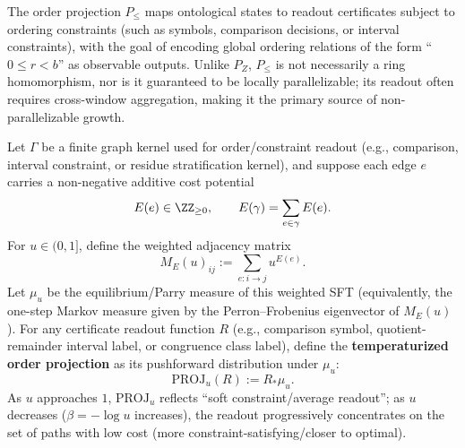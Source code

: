 \begin{definition}\label{def:pom-proj-order}
The order projection $P_{\le}$ maps ontological states to readout certificates subject to ordering constraints (such as symbols, comparison decisions, or interval constraints), with the goal of encoding global ordering relations of the form ``$0\le r<b$'' as observable outputs. Unlike $P_Z$, $P_{\le}$ is not necessarily a ring homomorphism, nor is it guaranteed to be locally parallelizable; its readout often requires cross-window aggregation, making it the primary source of non-parallelizable growth.
\end{definition}

\begin{definition}\label{def:pom-proj-temp}
Let $\Gamma$ be a finite graph kernel used for order/constraint readout (e.g., comparison, interval constraint, or residue stratification kernel), and suppose each edge $e$ carries a non-negative additive cost potential
\[
E(e)\in\ZZ_{\ge 0},
\qquad
E(\gamma)=\sum_{e\in\gamma}E(e).
\]
For $u\in(0,1]$, define the weighted adjacency matrix
\[
M_E(u)_{ij}:=\sum_{e:i\to j}u^{E(e)}.
\]
Let $\mu_u$ be the equilibrium/Parry measure of this weighted SFT (equivalently, the one-step Markov measure given by the Perron--Frobenius eigenvector of $M_E(u)$). For any certificate readout function $R$ (e.g., comparison symbol, quotient-remainder interval label, or congruence class label), define the \textbf{temperaturized order projection} as its pushforward distribution under $\mu_u$:
\[
\mathrm{PROJ}_u(R):=R_\ast\mu_u.
\]
As $u$ approaches $1$, $\mathrm{PROJ}_u$ reflects ``soft constraint/average readout''; as $u$ decreases ($\beta=-\log u$ increases), the readout progressively concentrates on the set of paths with low cost (more constraint-satisfying/closer to optimal).
\end{definition}

